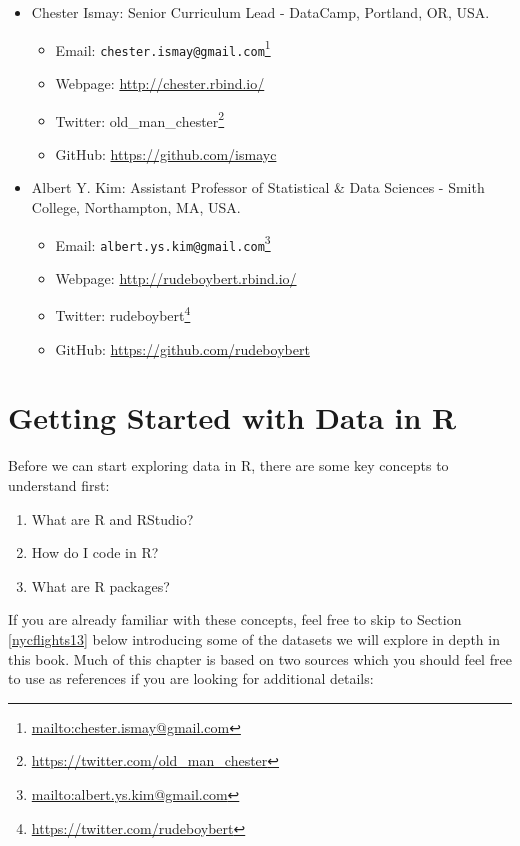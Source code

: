 \documentclass[12pt,]{krantz}
\providecommand{\tightlist}{%
  \setlength{\itemsep}{0pt}\setlength{\parskip}{0pt}}
\renewcommand{\href}[2]{#2\footnote{\url{#1}}}
\theoremstyle{definition}
\theoremstyle{definition}
\theoremstyle{definition}
\theoremstyle{remark}
\begin{document}
\begin{itemize}
\tightlist
\item
  Chester Ismay: Senior Curriculum Lead - DataCamp, Portland, OR, USA.

  \begin{itemize}
  \tightlist
  \item
    Email:
    \href{mailto:chester.ismay@gmail.com}{\nolinkurl{chester.ismay@gmail.com}}
  \item
    Webpage: \url{http://chester.rbind.io/}
  \item
    Twitter:
    \href{https://twitter.com/old_man_chester}{old\_man\_chester}
  \item
    GitHub: \url{https://github.com/ismayc}
  \end{itemize}
\item
  Albert Y. Kim: Assistant Professor of Statistical \& Data Sciences -
  Smith College, Northampton, MA, USA.

  \begin{itemize}
  \tightlist
  \item
    Email:
    \href{mailto:albert.ys.kim@gmail.com}{\nolinkurl{albert.ys.kim@gmail.com}}
  \item
    Webpage: \url{http://rudeboybert.rbind.io/}
  \item
    Twitter: \href{https://twitter.com/rudeboybert}{rudeboybert}
  \item
    GitHub: \url{https://github.com/rudeboybert}
  \end{itemize}
\end{itemize}

\chapter{Getting Started with Data in R}\label{getting-started}

Before we can start exploring data in R, there are some key concepts to
understand first:

\begin{enumerate}
\def\labelenumi{\arabic{enumi}.}
\tightlist
\item
  What are R and RStudio?
\item
  How do I code in R?
\item
  What are R packages?
\end{enumerate}

If you are already familiar with these concepts, feel free to skip to
Section \ref{nycflights13} below introducing some of the datasets we
will explore in depth in this book. Much of this chapter is based on two
sources which you should feel free to use as references if you are
looking for additional details:
\end{document}
